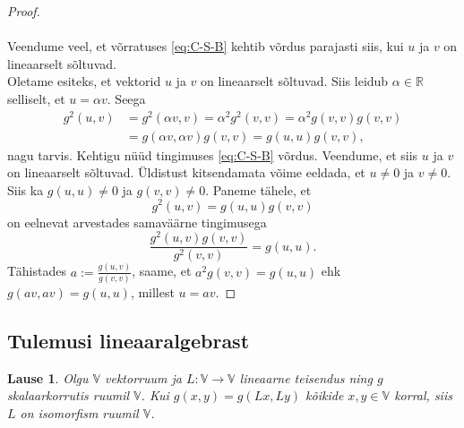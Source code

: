 \documentclass[a4paper,12pt]{article}
\theoremstyle{plain}
\newtheorem{lause}{Lause}[section]
\theoremstyle{definition}
\numberwithin{equation}{section}
\begin{document}
\begin{proof}
\paragraph{}
Veendume veel, et võrratuses \ref{eq:C-S-B} kehtib võrdus parajasti siis, kui $u$ ja $v$ on lineaarselt sõltuvad. \\
Oletame esiteks, et vektorid $u$ ja $v$ on lineaarselt sõltuvad. Siis leidub $\alpha \in \mathbb{R}$ selliselt, et $u = \alpha v$. Seega
\begin{align*}
g^2\left(u,v\right) &= g^2 \left(\alpha v,v\right) = \alpha^2 g^2 \left(v,v\right) = \alpha^2 g \left(v,v\right) g \left(v,v\right) \\
&= g \left(\alpha v,\alpha v\right)g \left( v,v\right) = g \left(u,u\right)g \left(v,v\right),
\end{align*}
nagu tarvis.
\newline
Kehtigu nüüd tingimuses \ref{eq:C-S-B} võrdus. Veendume, et siis $u$ ja $v$ on lineaarselt sõltuvad. Üldistust kitsendamata võime eeldada, et $u \neq 0$ ja $v \neq 0$. Siis ka $g \left(u,u\right) \neq 0$ ja $g \left(v,v\right) \neq 0$. Paneme tähele, et
\[g^2 \left(u, v \right) = g \left(u, u \right) g \left(v, v \right)\]
on eelnevat arvestades samaväärne tingimusega
\[\frac{g^2 \left(u, v \right) g \left(v, v \right)}{g^2 \left(v, v \right) } = g \left(u, u \right). \]
Tähistades $a := \frac{g \left(u, v \right) }{g \left(v, v \right) }$, saame, et $a^2 g \left(v, v \right) = g \left(u, u \right)$ ehk $g \left(av, av \right) = g \left(u, u \right)$, millest $u = av$.
\end{proof}

\subsection{Tulemusi lineaaralgebrast} \label{eelteadmised:algebra}
\begin{lause} \label{lemma:ort-skalaar-on-isomorfism}
Olgu $\mathbb{V}$ vektorruum ja $L : \mathbb{V} \rightarrow \mathbb{V}$ lineaarne teisendus ning $g$ skalaarkorrutis ruumil $\mathbb{V}$. Kui $g \left(x, y\right) = g \left(Lx, Ly\right)$ kõikide $x, y \in \mathbb{V}$ korral, siis $L$ on isomorfism ruumil $\mathbb{V}$.
\end{lause}
\end{document}
